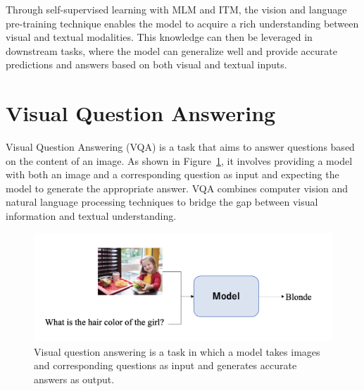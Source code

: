 Through self-supervised learning with MLM and ITM, the vision and language pre-training technique enables the model to acquire a rich understanding between visual and textual modalities. This knowledge can then be leveraged in downstream tasks, where the model can generalize well and provide accurate predictions and answers based on both visual and textual inputs.


\section{Visual Question Answering}
\label{vqa}
Visual Question Answering (VQA) \cite{VQA, balanced_binary_vqa, balanced_vqa_v2} is a task that aims to answer questions based on the content of an image. As shown in Figure~\ref{fig:vqa}, it involves providing a model with both an image and a corresponding question as input and expecting the model to generate the appropriate answer. VQA combines computer vision and natural language processing techniques to bridge the gap between visual information and textual understanding. 

\begin{figure}[t]
\begin{center}
\includegraphics[width=1.0\linewidth]{Chapter_2/chap2_vqa.png}
\end{center}
   \caption{Visual question answering \cite{liu2022dpt} is a task in which a model takes images and corresponding questions as input and generates accurate answers as output.
}
\label{fig:vqa}
\end{figure}

